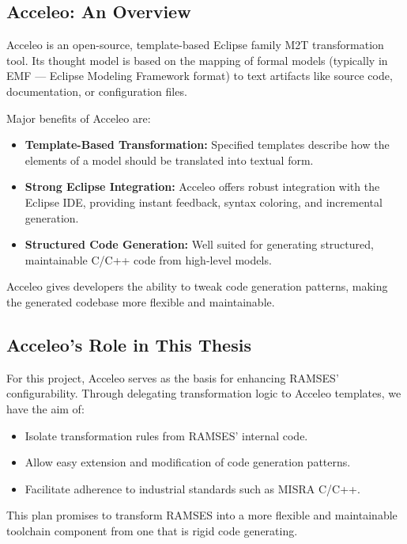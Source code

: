 \subsection*{Acceleo: An Overview}

Acceleo is an open-source, template-based Eclipse family M2T transformation tool. Its thought model is based on the mapping of formal models (typically in EMF — Eclipse Modeling Framework format) to text artifacts like source code, documentation, or configuration files.

Major benefits of Acceleo are: 
\begin{itemize} 
	\item \textbf{Template-Based Transformation:} Specified templates describe how the elements of a model should be translated into textual form.
	\item \textbf{Strong Eclipse Integration:} Acceleo offers robust integration with the Eclipse IDE, providing instant feedback, syntax coloring, and incremental generation.
	\item \textbf{Structured Code Generation:} Well suited for generating structured, maintainable C/C++ code from high-level models.
\end{itemize}

\begin{tcolorbox}[colback=blue!5, colframe=blue!40!black] Acceleo gives developers the ability to tweak code generation patterns, making the generated codebase more flexible and maintainable. \end{tcolorbox}

\subsection*{Acceleo’s Role in This Thesis}

For this project, Acceleo serves as the basis for enhancing RAMSES' configurability. Through delegating transformation logic to Acceleo templates, we have the aim of: 
\begin{itemize} 
	\item Isolate transformation rules from RAMSES' internal code.
	\item Allow easy extension and modification of code generation patterns.
	\item Facilitate adherence to industrial standards such as MISRA C/C++.
\end{itemize}

This plan promises to transform RAMSES into a more flexible and maintainable toolchain component from one that is rigid code generating.




